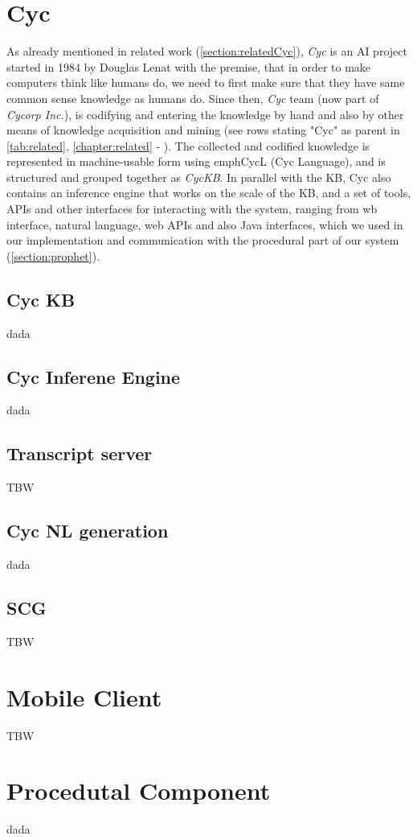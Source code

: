 \section{Cyc}
\label{section:Cyc}
As already mentioned in related work (\autoref{section:relatedCyc}), \emph{Cyc}
is an AI project started in 1984 by Douglas Lenat\parencite{Lenat1985} with the
premise, that in order to make computers think like humans do, we need to first
make sure that they have same common sense knowledge as humans do. Since then,
\emph {Cyc} team (now part of \emph{Cycorp Inc.}), is codifying and entering 
the knowledge by hand and also by other means of knowledge acquisition and 
mining (see rows stating "Cyc" as parent in \autoref{tab:related}, 
\autoref{chapter:related} - ). 
The collected and codified knowledge is represented in machine-usable form 
using emph{CycL (Cyc Language)}, and is structured and grouped together as
\emph{CycKB}. In parallel with the KB, Cyc also contains an inference engine
that works on the scale of the KB, and a set of tools, APIs and other interfaces
for interacting with the system, ranging from wb interface, natural language,
web APIs and also Java interfaces, which we used in our implementation and
communication with the procedural part of our system 
(\autoref{section:prophet}).


\subsection{Cyc KB}
\label{section:cyckb}
dada

\subsection{Cyc Inferene Engine}
\label{section:cycinference}
dada

\subsection{Transcript server}
\label{section:transcriptserver}
TBW

\subsection{Cyc NL generation}
\label{section:cycnl}
dada

\subsection{SCG}
\label{section:scg}
TBW

\section{Mobile Client}
\label{section:app}
TBW

\section{Procedutal Component}
\label{section:prophet}
dada
